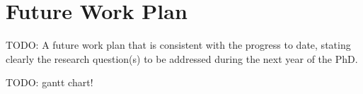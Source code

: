 \section{Future Work Plan}
TODO: A future work plan that is consistent with the progress to date, stating clearly the research question(s) to be addressed during the next year of the PhD.

TODO: gantt chart!